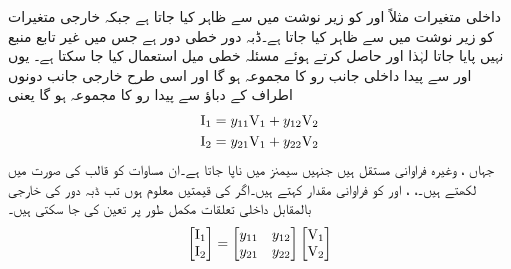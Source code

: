  داخلی متغیرات مثلاً  اور  کو زیر نوشت میں  سے ظاہر کیا جاتا ہے  جبکہ خارجی متغیرات کو زیر نوشت میں  سے ظاہر کیا جاتا ہے۔ڈبہ دور خطی دور ہے جس میں غیر تابع منبع نہیں پایا جاتا لہٰذا  اور  حاصل کرتے ہوئے مسئلہ خطی میل استعمال کیا جا سکتا ہے۔ یوں  اور  سے پیدا داخلی جانب رو کا مجموعہ  ہو گا اور اسی طرح خارجی جانب دونوں اطراف کے دباؤ سے پیدا رو کا مجموعہ  ہو گا یعنی
\begin{gather}
\begin{aligned}\label{مساوات_نمونہ_الف}
{\ensuremath{{\textup{I}}}}_1&=y_{11}{{\textup{V}}}_1+y_{12}{{\textup{V}}}_2\\
{{\textup{I}}}_2&=y_{21}{{\textup{V}}}_1+y_{22}{{\textup{V}}}_2
\end{aligned}
\end{gather}  
جہاں ،  وغیرہ فراوانی مستقل ہیں جنہیں سیمنز  میں ناپا جاتا ہے۔ان مساوات کو قالب کی صورت میں لکھتے ہیں۔، ،  اور  کو فراوانی مقدار  کہتے ہیں۔اگر  کی قیمتیں معلوم ہوں تب ڈبہ دور کی خارجی بالمقابل داخلی تعلقات مکمل طور پر تعین کی جا سکتی ہیں۔ 
\begin{align}\label{مساوات_نمونہ_ب}
\begin{bmatrix}
{\ensuremath{{\textup{I}}}}_1 \\
{{\textup{I}}}_2
\end{bmatrix}
=
\begin{bmatrix}
y_{11} & y_{12}\\
y_{21} & y_{22}
\end{bmatrix}
\begin{bmatrix}
{\ensuremath{{\textup{V}}}}_1\\
{{\textup{V}}}_2
\end{bmatrix}
\end{align}

